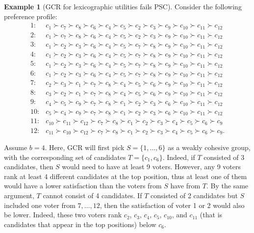 \documentclass[10pt]{scrartcl}
\theoremstyle{definition}
\newtheorem{example}{Example}
\theoremstyle{plain}
\begin{document}
\begin{example}[GCR for lexicographic utilities fails PSC]
	Consider the following preference profile:
	\begin{align*}
		1\colon & c_1 \succ c_7 \succ c_8 \succ c_6  \succ c_4 \succ c_5 \succ c_2 \succ c_3 \succ c_9 \succ c_{10} \succ c_{11} \succ c_{12} \\
		2\colon & c_1 \succ c_7 \succ c_8 \succ c_6  \succ c_4 \succ c_5 \succ c_2 \succ c_3 \succ c_9 \succ c_{10} \succ c_{11} \succ c_{12} \\
		3\colon & c_1 \succ c_2 \succ c_3 \succ c_6  \succ c_4 \succ c_5 \succ c_7 \succ c_8 \succ c_9 \succ c_{10} \succ c_{11} \succ c_{12} \\
		4\colon & c_1 \succ c_2 \succ c_3 \succ c_6  \succ c_4 \succ c_5 \succ c_7 \succ c_8 \succ c_9 \succ c_{10} \succ c_{11} \succ c_{12} \\
		5\colon & c_1 \succ c_2 \succ c_3 \succ c_6  \succ c_4 \succ c_5 \succ c_7 \succ c_8 \succ c_9 \succ c_{10} \succ c_{11} \succ c_{12} \\
		6\colon & c_1 \succ c_2 \succ c_3 \succ c_6  \succ c_4 \succ c_5 \succ c_7 \succ c_8 \succ c_9 \succ c_{10} \succ c_{11} \succ c_{12} \\
		7\colon & c_2 \succ c_3 \succ c_1 \succ c_7  \succ c_8 \succ c_4 \succ c_5 \succ c_6 \succ c_9 \succ c_{10} \succ c_{11} \succ c_{12} \\
		8\colon & c_3 \succ c_2 \succ c_1 \succ c_7  \succ c_8 \succ c_4 \succ c_5 \succ c_6 \succ c_9 \succ c_{10} \succ c_{11} \succ c_{12} \\
		9\colon & c_4 \succ c_5 \succ c_9 \succ c_7  \succ c_8 \succ c_1 \succ c_2 \succ c_3 \succ c_6 \succ c_{10} \succ c_{11} \succ c_{12} \\
		10\colon & c_5 \succ c_4 \succ c_9 \succ c_7  \succ c_8 \succ c_1 \succ c_2 \succ c_3 \succ c_6 \succ c_{10} \succ c_{11} \succ c_{12} \\
		11\colon & c_{10} \succ c_{11} \succ c_{12} \succ c_7  \succ c_8 \succ c_1 \succ c_2 \succ c_3 \succ c_4 \succ c_5 \succ c_6 \succ c_9 \\
		12\colon & c_{11} \succ c_{10} \succ c_{12} \succ c_7  \succ c_8 \succ c_1 \succ c_2 \succ c_3 \succ c_4 \succ c_5 \succ c_6 \succ c_9 \text{.}
	\end{align*}
	
	Assume $b = 4$. Here, GCR will first pick $S = \{1, \ldots, 6\}$ as a weakly cohesive group, with the corresponding set of candidates $T = \{c_1, c_6\}$. Indeed, if $T$ consisted of $3$ candidates, then $S$ would need to have at least 9 voters. However, any 9 voters rank at least 4 different candidates at the top position, thus at least one of them would have a lower satisfaction than the voters from $S$ have from $T$. By the same argument, $T$ cannot consist of 4 candidates. If $T$ consisted of 2 candidates but $S$ included one voter from $7, \ldots, 12$, then the satisfaction of voter 1 or 2 would also be lower. Indeed, these two voters rank $c_2$, $c_3$, $c_4$, $c_5$, $c_{10}$, and $c_{11}$ (that is candidates that appear in the top positions) below $c_6$.
	

\end{example}
\end{document}
